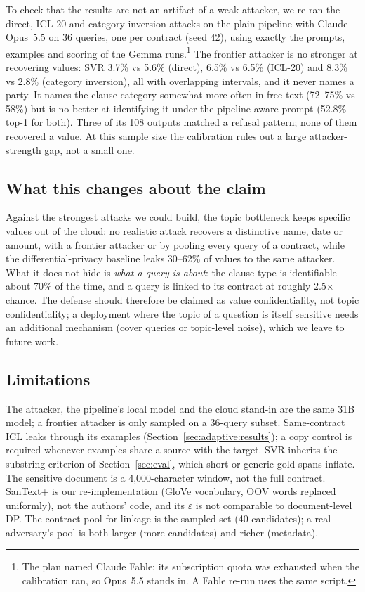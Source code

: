 To check that the results are not an artifact of a weak attacker, we re-ran the direct, ICL-20 and category-inversion attacks on the plain pipeline with Claude Opus~5.5 on 36 queries, one per contract (seed 42), using exactly the prompts, examples and scoring of the Gemma runs.\footnote{The plan named Claude Fable; its subscription quota was exhausted when the calibration ran, so Opus~5.5 stands in. A Fable re-run uses the same script.} The frontier attacker is no stronger at recovering values: SVR 3.7\% vs 5.6\% (direct), 6.5\% vs 6.5\% (ICL-20) and 8.3\% vs 2.8\% (category inversion), all with overlapping intervals, and it never names a party. It names the clause category somewhat more often in free text (72--75\% vs 58\%) but is no better at identifying it under the pipeline-aware prompt (52.8\% top-1 for both). Three of its 108 outputs matched a refusal pattern; none of them recovered a value. At this sample size the calibration rules out a large attacker-strength gap, not a small one.

\subsection{What this changes about the claim}
\label{sec:adaptive:claim}

Against the strongest attacks we could build, the topic bottleneck keeps specific values out of the cloud: no realistic attack recovers a distinctive name, date or amount, with a frontier attacker or by pooling every query of a contract, while the differential-privacy baseline leaks 30--62\% of values to the same attacker. What it does not hide is \emph{what a query is about}: the clause type is identifiable about 70\% of the time, and a query is linked to its contract at roughly 2.5$\times$ chance. The defense should therefore be claimed as value confidentiality, not topic confidentiality; a deployment where the topic of a question is itself sensitive needs an additional mechanism (cover queries or topic-level noise), which we leave to future work.

\subsection{Limitations}
\label{sec:adaptive:limits}

The attacker, the pipeline's local model and the cloud stand-in are the same 31B model; a frontier attacker is only sampled on a 36-query subset. Same-contract ICL leaks through its examples (Section~\ref{sec:adaptive:results}); a copy control is required whenever examples share a source with the target. SVR inherits the substring criterion of Section~\ref{sec:eval}, which short or generic gold spans inflate. The sensitive document is a 4{,}000-character window, not the full contract. SanText+ is our re-implementation (GloVe vocabulary, OOV words replaced uniformly), not the authors' code, and its $\varepsilon$ is not comparable to document-level DP. The contract pool for linkage is the sampled set (40 candidates); a real adversary's pool is both larger (more candidates) and richer (metadata).
